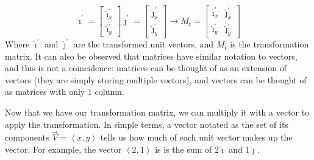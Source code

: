 \documentclass[a4paper]{article}
\newcommand*{\ihat}{\hat{\imath}}
\newcommand*{\jhat}{\hat{\jmath}}
\begin{document}
\[
\ihat^\prime = 
\begin{bmatrix}
    \ihat^\prime_x \\
    \ihat^\prime_y
\end{bmatrix}
\jhat^\prime = 
\begin{bmatrix}
    \jhat^\prime_x \\
    \jhat^\prime_y
\end{bmatrix}\rightarrow 
M_t =
\begin{bmatrix}
    \ihat^\prime_x & \jhat^\prime_x\\
    \ihat^\prime_y & \jhat^\prime_y
\end{bmatrix}
\]
Where $\ihat^\prime$ and $\jhat^\prime$ are the transformed unit vectors, and $M_t$ is the transformation matrix. It can also be observed that matrices have similar notation to vectors, and this is not a coincidence: matrices can be thought of as an extension of vectors (they are simply storing multiple vectors), and vectors can be thought of as matrices with only 1 column.

Now that we have our transformation matrix, we can multiply it with a vector to apply the transformation. In simple terms, a vector notated as the set of its components $\vec{V} = \left\langle x, y\right\rangle $ tells us how much of each unit vector makes up the vector. For example, the vector $\left\langle 2, 1\right\rangle $ is is the sum of $2\ihat$ and $1\jhat$.
\end{document}
